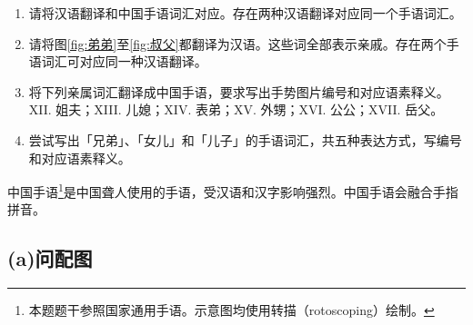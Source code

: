 \documentclass[12pt, a4paper, oneside]{ctexart}
\begin{document}
\begin{enumerate}[label=(\alph*)]
    \item 请将汉语翻译和中国手语词汇对应。存在两种汉语翻译对应同一个手语词汇。
    \item 请将图\ref{fig:弟弟}至\ref{fig:叔父}都翻译为汉语。这些词全部表示亲戚。存在两个手语词汇可对应同一种汉语翻译。
    \item 将下列亲属词汇翻译成中国手语，要求写出手势图片编号和对应语素释义。\\
    XII. 姐夫；XIII. 儿媳；XIV. 表弟；XV. 外甥；XVI. 公公；XVII. 岳父。
    \item 尝试写出「兄弟」、「女儿」和「儿子」的手语词汇，共五种表达方式，写编号和对应语素释义。
\end{enumerate}

\Mundus 中国手语\footnote{本题题干参照国家通用手语。示意图均使用转描（rotoscoping）绘制。}是中国聋人使用的手语，受汉语和汉字影响强烈。中国手语会融合手指拼音。

\begin{flushright}{}\end{flushright}

\subsection{(a)问配图}

\begin{figure}[H]
    \centering
    \caption{}
    \label{fig:男}
\end{figure}
\end{document}
